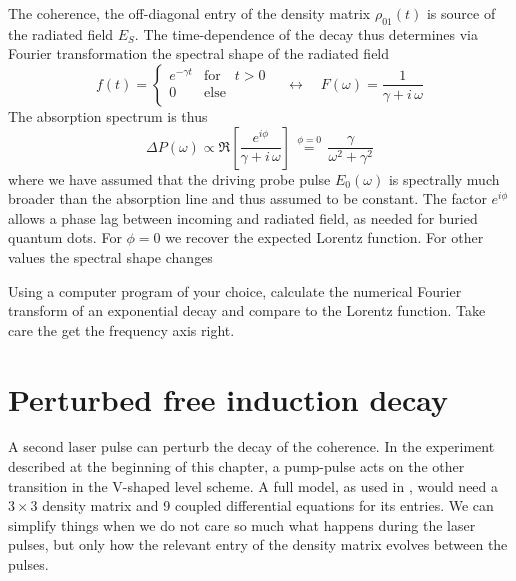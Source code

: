 The coherence, the off-diagonal entry of the density matrix $\rho_{01}(t)$ is source of the radiated field $E_S$. The time-dependence of the decay thus determines via Fourier transformation the spectral shape of the radiated field
\begin{equation}
 f(t) = \left\{ \begin{array}{ll}
e^{- \gamma t } & \text{for} \quad t > 0 \\
 0 & \text{else} \\
 \end{array}
 \right.
 \quad 
 \leftrightarrow \quad
  F(\omega) = \frac{1}{\gamma + i \, \omega}
\end{equation}
The absorption spectrum is thus
\begin{equation}
\Delta P (\omega)  \propto \Re \left[  \frac{e^{i \phi}}{\gamma + i \, \omega}       \right] \, \overset{\phi = 0}{=} \, \frac{\gamma}{\omega^2 + \gamma^2}
\end{equation}
where we have assumed that the driving probe pulse $E_0(\omega)$ is spectrally much broader than the absorption line and thus assumed to be constant. The factor $e^{i \phi}$ allows a phase lag between incoming and radiated field, as needed for buried quantum dots. For $\phi = 0$ we recover the expected Lorentz function. For other values the spectral shape changes

\begin{questions}

\item Using a computer program of your choice, calculate  the numerical Fourier transform of an exponential decay and compare to the Lorentz function. Take care the get the frequency axis right.

\end{questions}
 
 
 
\section{Perturbed free induction decay}

A second laser pulse can perturb the decay of the coherence. In the experiment described at the beginning of this chapter, a pump-pulse acts on the other transition in the V-shaped level scheme. A full model, as used in \citep{Wolpert:2012hs}, would need a $3 \times 3$ density matrix and 9 coupled differential equations for its entries. We can simplify things when we do not care so much what happens during the laser pulses, but only how the relevant entry of the density matrix evolves between the pulses.

